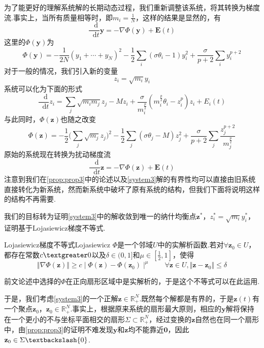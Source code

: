 \documentclass[11pt,a4paper]{article}
\newcommand*{\dif}{\mathop{}\!\mathrm{d}}%
\theoremstyle{definition}
\begin{document}
	为了能更好的理解系统解的长期动态过程，我们重新调整该系统，将其转换为梯度流.事实上，当所有质量相等时，即$m_{i}=\frac{1}{N}$，这样的结果是显然的，有
	\begin{equation}\label{equality4}
		\dfrac{\dif}{\dif t}\textbf{y}=-\nabla\Phi(\textbf{y})+\textbf{E}(t)
	\end{equation}
	这里的$\Phi(\textbf{y})$为\[ \Phi(\textbf{y})=-\dfrac{1}{2N}(y_{1}+\cdots+y_{N})^{2}-\dfrac{1}{2}\sum_{i}(\sigma\theta_{i}-1)y_{i}^{2}+\dfrac{\sigma}{p+2}\sum_{i}y_{i}^{p+2} \]
	对于一般的情况，我们引入新的变量\[ z_{i}=\sqrt{m_{i}}y_{i} \]
	系统可以化为下面的形式\[ \dfrac{\dif}{\dif t}z_{i}=\sum_{j}\sqrt{m_{i}m_{j}}z_{j}-Mz_{i}+\dfrac{\sigma}{m_{i}^{\frac{p}{2}}}(m_{i}^{\frac{p}{2}}\theta_{i}-z_{i}^{p})z_{i}+E_{i}(t) \]
	与此同时，$\Phi(\textbf{z})$也随之改变\[ \Phi(\textbf{z})=-\dfrac{1}{2}\Bigg(\sum_{j}\sqrt{m_{j}}z_{j}\Bigg)^{2}-\dfrac{1}{2}\sum_{j}(\sigma\theta_{j}-M)z_{j}^{2}+\dfrac{\sigma}{p+2}\sum_{j}\dfrac{z_{j}^{p+2}}{m_{j}^{\frac{p}{2}}} \] 
	原始的系统现在转换为扰动梯度流 
	\begin{equation}\label{system3}
		\dfrac{\dif}{\dif t}\textbf{z}=-\nabla\Phi(\textbf{z})+\textbf{E}(t)
	\end{equation} 
	注意到我们在\eqref{prop:prop3}中的论述以及\eqref{system3}解的有界性均可以直接由旧系统直接转化为新系统，然而新系统中破坏了原有系统的结构，但我们下面将说明这样的结构不再需要.
	
	我们的目标转为证明\eqref{system3}中的解收敛到唯一的纳什均衡点$\textbf{z}^{*}$，$z_{i}^{*}=\sqrt{m_{i}}y_{i}^{*}$，证明基于Lojasiewicz梯度不等式.
	
	\begin{thm}{Lojasiewicz梯度不等式\cite{ref5}}{Lojasiewicz}
		$\Phi$是一个邻域$\mathit{U}$中的实解析函数.若对$\forall\textbf{z}_{0}\in U$，都存在常数$c\textgreater0$以及$\delta\in(0,1]$和$\mu\in[\frac{1}{2},1]$，使得\[ \Vert\nabla\Phi(\textbf{z})\Vert\geq c\mid\Phi(\textbf{z})-\Phi(\textbf{z}_{0})\mid^{\mu}\qquad\forall\textbf{z}\in \mathit{U},\Vert\textbf{z}-\textbf{z}_{0}\Vert\leq\delta \]
	\end{thm}
	前文论述中选择的$\Phi$在正向扇形区域中是实解析的，于是这个不等式可以在此运用.
	
	于是，我们考虑\eqref{system3}的一个正解$\textbf{z}\in\mathbb{R}_{+}^{N}$.既然每个解都是有界的，于是$\textbf{z}(t)$有一个聚点$\textbf{z}_{0}$，$\textbf{z}_{0}\in\mathbb{R}_{+}^{N}$.事实上，根据原来系统的扇形最大原则，相应的$\textbf{y}$解将保持在一个更小的不与坐标平面相交的扇形$\Sigma\subset\mathbb{R}_{+}^{N}$，经过变换的$ \textbf{z}$自然也在同一个扇形中，由\eqref{prop:prop3}的证明不难发现$\textbf{y}$和$\textbf{z}$均不能靠近$\textbf{0}$，因此$\textbf{z}_{0}\in\Sigma\textbackslash{0}$.
	
\end{document}
